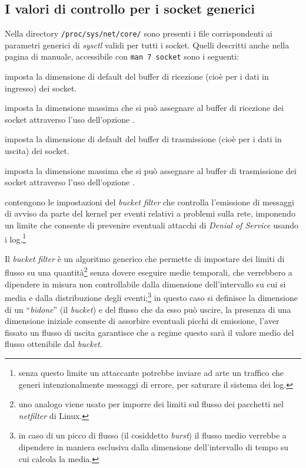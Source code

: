 \subsection{I valori di controllo per i socket generici}
\label{sec:sock_gen_sysctl}

Nella directory \texttt{/proc/sys/net/core/} sono presenti i file
corrispondenti ai parametri generici di \textit{sysctl} validi per tutti i
socket.  Quelli descritti anche nella pagina di manuale, accessibile con
\texttt{man 7 socket} sono i seguenti:

\begin{basedescript}{\desclabelwidth{2.2cm}\desclabelstyle{\nextlinelabel}}
\item[\sysctlrelfiled{net/core}{rmem\_default}] imposta la dimensione
  di default del buffer di ricezione (cioè per i dati in ingresso) dei socket.
\item[\sysctlrelfiled{net/core}{rmem\_max}] imposta la dimensione
  massima che si può assegnare al buffer di ricezione dei socket attraverso
  l'uso dell'opzione .
\item[\sysctlrelfiled{net/core}{wmem\_default}] imposta la dimensione
  di default del buffer di trasmissione (cioè per i dati in uscita) dei
  socket.
\item[\sysctlrelfiled{net/core}{wmem\_max}] imposta la dimensione
  massima che si può assegnare al buffer di trasmissione dei socket attraverso
  l'uso dell'opzione .
\item[\sysctlrelfiled{net/core}{message\_cost},
  \sysctlrelfiled{net/core}{message\_burst}] contengono le impostazioni del
  \textit{bucket filter} che controlla l'emissione di
  messaggi di avviso da parte del kernel per eventi relativi a problemi sulla
  rete, imponendo un limite che consente di prevenire eventuali attacchi di
  \textit{Denial of Service} usando i log.\footnote{senza questo limite un
    attaccante potrebbe inviare ad arte un traffico che generi
    intenzionalmente messaggi di errore, per saturare il sistema dei log.}


  Il \textit{bucket filter} è un algoritmo generico che permette di impostare
  dei limiti di flusso su una quantità\footnote{uno analogo viene usato per
    imporre dei limiti sul flusso dei pacchetti nel \textit{netfilter} di
    Linux.}  senza dovere eseguire medie temporali, che verrebbero a dipendere
  in misura non controllabile dalla dimensione dell'intervallo su cui si media
  e dalla distribuzione degli eventi;\footnote{in caso di un picco di flusso
    (il cosiddetto \textit{burst}) il flusso medio verrebbe a dipendere in
    maniera esclusiva dalla dimensione dell'intervallo di tempo su cui calcola
    la media.} in questo caso si definisce la dimensione di un
  ``\textsl{bidone}'' (il \textit{bucket}) e del flusso che da esso può
  uscire, la presenza di una dimensione iniziale consente di assorbire
  eventuali picchi di emissione, l'aver fissato un flusso di uscita garantisce
  che a regime questo sarà il valore medio del flusso ottenibile dal
  \textit{bucket}.


\end{basedescript}
